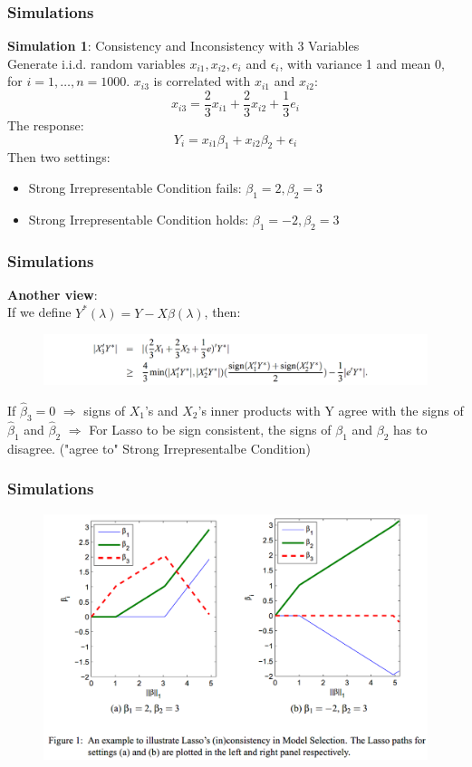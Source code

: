 \documentclass{beamer}
\begin{document}
	\begin{frame}
		\frametitle{Simulations}
		\textbf{Simulation 1}: Consistency and Inconsistency with 3 Variables\\
		Generate i.i.d. random variables $x_{i1}, x_{i2}, e_i$ and $\epsilon_i$, with variance 1 and mean 0, for $i=1,\ldots,n=1000$. $x_{i3}$ is correlated with $x_{i1}$ and $x_{i2}$:
		$$x_{i3} = \frac{2}{3}x_{i1} + \frac{2}{3}x_{i2} + \frac{1}{3}e_i$$
		The response:
		$$Y_i = x_{i1}\beta_1 + x_{i2}\beta_2 + \epsilon_i$$
		Then two settings:
		\begin{itemize}
			\item 
			Strong Irrepresentable Condition fails: $\beta_1 = 2, \beta_2 = 3$ 
			\item
			Strong Irrepresentable Condition holds: $\beta_1 = -2, \beta_2 = 3$ 
		\end{itemize}
	\end{frame}
	
	\begin{frame}
		\frametitle{Simulations}
		\textbf{Another view}:\\
		If we define $Y^*(\lambda) = Y - X\hat{\beta}(\lambda)$, then:
		\begin{figure}
			\includegraphics[width=1.1\linewidth]{image015.png}
		\end{figure}
		If $\hat{\beta}_3 = 0$ $\Rightarrow$ signs of $X_1$'s and $X_2$'s inner products with Y agree with the signs of $\hat{\beta}_1$ and $\hat{\beta}_2$ $\Rightarrow$ For Lasso to be sign consistent, the signs of $\beta_1$ and $\beta_2$ has to disagree. ("agree to" Strong Irrepresentalbe Condition)
	\end{frame}
	
	\begin{frame}
		\frametitle{Simulations}
		\begin{figure}
			\includegraphics[width=1\linewidth]{image016.png}
		\end{figure}
	\end{frame}
	
\end{document}

